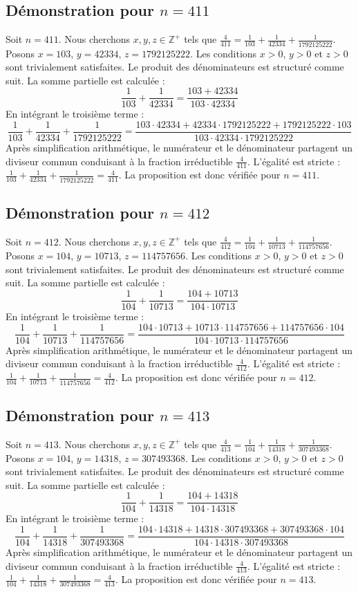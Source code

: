 \documentclass[11pt,a4paper]{article}
\begin{document}
\subsection{Démonstration pour $n = 411$}
Soit $n = 411$. Nous cherchons $x, y, z \in \mathbb{Z}^{+}$ tels que $\frac{4}{411} = \frac{1}{103} + \frac{1}{42334} + \frac{1}{1792125222}$.
Posons $x = 103$, $y = 42334$, $z = 1792125222$.
Les conditions $x > 0$, $y > 0$ et $z > 0$ sont trivialement satisfaites.
Le produit des dénominateurs est structuré comme suit. La somme partielle est calculée :
$$ \frac{1}{103} + \frac{1}{42334} = \frac{103+42334}{103 \cdot 42334} $$
En intégrant le troisième terme :
$$ \frac{1}{103} + \frac{1}{42334} + \frac{1}{1792125222} = \frac{103 \cdot 42334 + 42334 \cdot 1792125222 + 1792125222 \cdot 103}{103 \cdot 42334 \cdot 1792125222} $$
Après simplification arithmétique, le numérateur et le dénominateur partagent un diviseur commun conduisant à la fraction irréductible $\frac{4}{411}$.
L'égalité est stricte : $\frac{1}{103} + \frac{1}{42334} + \frac{1}{1792125222} = \frac{4}{411}$.
La proposition est donc vérifiée pour $n = 411$.
\subsection{Démonstration pour $n = 412$}
Soit $n = 412$. Nous cherchons $x, y, z \in \mathbb{Z}^{+}$ tels que $\frac{4}{412} = \frac{1}{104} + \frac{1}{10713} + \frac{1}{114757656}$.
Posons $x = 104$, $y = 10713$, $z = 114757656$.
Les conditions $x > 0$, $y > 0$ et $z > 0$ sont trivialement satisfaites.
Le produit des dénominateurs est structuré comme suit. La somme partielle est calculée :
$$ \frac{1}{104} + \frac{1}{10713} = \frac{104+10713}{104 \cdot 10713} $$
En intégrant le troisième terme :
$$ \frac{1}{104} + \frac{1}{10713} + \frac{1}{114757656} = \frac{104 \cdot 10713 + 10713 \cdot 114757656 + 114757656 \cdot 104}{104 \cdot 10713 \cdot 114757656} $$
Après simplification arithmétique, le numérateur et le dénominateur partagent un diviseur commun conduisant à la fraction irréductible $\frac{4}{412}$.
L'égalité est stricte : $\frac{1}{104} + \frac{1}{10713} + \frac{1}{114757656} = \frac{4}{412}$.
La proposition est donc vérifiée pour $n = 412$.
\subsection{Démonstration pour $n = 413$}
Soit $n = 413$. Nous cherchons $x, y, z \in \mathbb{Z}^{+}$ tels que $\frac{4}{413} = \frac{1}{104} + \frac{1}{14318} + \frac{1}{307493368}$.
Posons $x = 104$, $y = 14318$, $z = 307493368$.
Les conditions $x > 0$, $y > 0$ et $z > 0$ sont trivialement satisfaites.
Le produit des dénominateurs est structuré comme suit. La somme partielle est calculée :
$$ \frac{1}{104} + \frac{1}{14318} = \frac{104+14318}{104 \cdot 14318} $$
En intégrant le troisième terme :
$$ \frac{1}{104} + \frac{1}{14318} + \frac{1}{307493368} = \frac{104 \cdot 14318 + 14318 \cdot 307493368 + 307493368 \cdot 104}{104 \cdot 14318 \cdot 307493368} $$
Après simplification arithmétique, le numérateur et le dénominateur partagent un diviseur commun conduisant à la fraction irréductible $\frac{4}{413}$.
L'égalité est stricte : $\frac{1}{104} + \frac{1}{14318} + \frac{1}{307493368} = \frac{4}{413}$.
La proposition est donc vérifiée pour $n = 413$.
\end{document}
